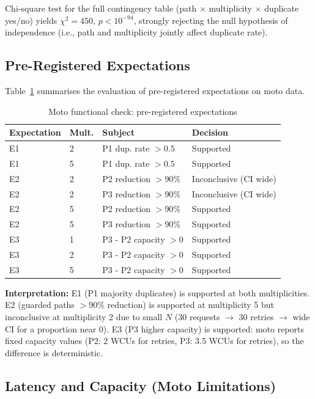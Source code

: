 Chi-square test for the full contingency table (path $\times$ multiplicity $\times$ duplicate yes/no) yields $\chi^2 = 450$, $p < 10^{-94}$, strongly rejecting the null hypothesis of independence (i.e., path and multiplicity jointly affect duplicate rate).

\subsection{Pre-Registered Expectations}

Table~\ref{tab:moto_expectations} summarises the evaluation of pre-registered expectations on moto data.

\begin{table}[h]
\centering
\caption{Moto functional check: pre-registered expectations}
\label{tab:moto_expectations}
\begin{tabular}{llll}
\hline
\textbf{Expectation} & \textbf{Mult.} & \textbf{Subject} & \textbf{Decision} \\
\hline
E1 & 2 & P1 dup. rate $> 0.5$ & Supported \\
E1 & 5 & P1 dup. rate $> 0.5$ & Supported \\
E2 & 2 & P2 reduction $> 90\%$ & Inconclusive (CI wide) \\
E2 & 2 & P3 reduction $> 90\%$ & Inconclusive (CI wide) \\
E2 & 5 & P2 reduction $> 90\%$ & Supported \\
E2 & 5 & P3 reduction $> 90\%$ & Supported \\
E3 & 1 & P3 - P2 capacity $> 0$ & Supported \\
E3 & 2 & P3 - P2 capacity $> 0$ & Supported \\
E3 & 5 & P3 - P2 capacity $> 0$ & Supported \\
\hline
\end{tabular}
\end{table}

\textbf{Interpretation:} E1 (P1 majority duplicates) is supported at both multiplicities. E2 (guarded paths $> 90\%$ reduction) is supported at multiplicity 5 but inconclusive at multiplicity 2 due to small $N$ (30 requests $\rightarrow$ 30 retries $\rightarrow$ wide CI for a proportion near 0). E3 (P3 higher capacity) is supported: moto reports fixed capacity values (P2: 2 WCUs for retries, P3: 3.5 WCUs for retries), so the difference is deterministic.

\subsection{Latency and Capacity (Moto Limitations)}


